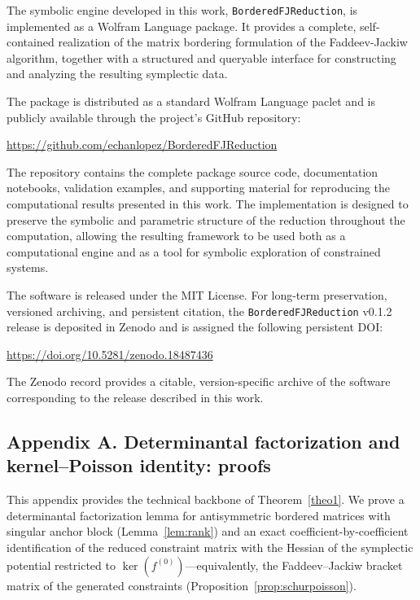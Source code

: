 \documentclass[11pt,a4paper]{article}
\begin{document}
The symbolic engine developed in this work, \texttt{BorderedFJReduction}, is implemented as a Wolfram Language package. It provides a complete, self-contained realization of the matrix bordering formulation of the Faddeev-Jackiw algorithm, together with a structured and queryable interface for constructing and analyzing the resulting symplectic data.

The package is distributed as a standard Wolfram Language paclet and is publicly available through the project's GitHub repository:

\begin{center}
	\url{https://github.com/echanlopez/BorderedFJReduction}
\end{center}

The repository contains the complete package source code, documentation notebooks, validation examples, and supporting material for reproducing the computational results presented in this work. The implementation is designed to preserve the symbolic and parametric structure of the reduction throughout the computation, allowing the resulting framework to be used both as a computational engine and as a tool for symbolic exploration of constrained systems.

The software is released under the MIT License. For long-term preservation, versioned archiving, and persistent citation, the \texttt{BorderedFJReduction} v0.1.2 release is deposited in Zenodo and is assigned the following persistent DOI:

\begin{center}
	\url{https://doi.org/10.5281/zenodo.18487436}
\end{center}

The Zenodo record provides a citable, version-specific archive of the software corresponding to the release described in this work.

\subsection*{Appendix A. Determinantal factorization and kernel--Poisson identity: proofs}

This appendix provides the technical backbone of Theorem~\ref{theo1}. We prove a determinantal factorization lemma for antisymmetric bordered matrices with singular anchor block (Lemma~\ref{lem:rank}) and an exact coefficient-by-coefficient identification of the reduced constraint matrix with the Hessian of the symplectic potential restricted to $\ker(f^{(0)})$---equivalently, the Faddeev--Jackiw bracket matrix of the generated constraints (Proposition~\ref{prop:schurpoisson}).
\end{document}
